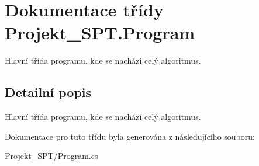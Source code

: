 \hypertarget{class_projekt___s_p_t_1_1_program}{}\section{Dokumentace třídy Projekt\+\_\+\+S\+P\+T.\+Program}
\label{class_projekt___s_p_t_1_1_program}


Hlavní třída programu, kde se nachází celý algoritmus.  




\subsection{Detailní popis}
Hlavní třída programu, kde se nachází celý algoritmus. 

Dokumentace pro tuto třídu byla generována z následujícího souboru\+:\begin{DoxyCompactItemize}
\item 
Projekt\+\_\+\+S\+P\+T/\mbox{\hyperlink{_program_8cs}{Program.\+cs}}\end{DoxyCompactItemize}
